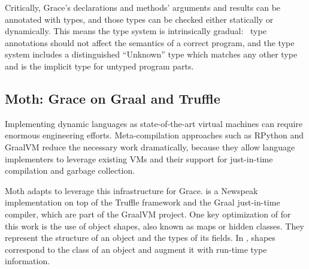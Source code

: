 Critically, Grace's declarations and methods' arguments
and results can be annotated with types, and those types can be  checked
either statically or dynamically. This means the type system is
intrinsically gradual:%
%
~type annotations should not affect the semantics of a correct
program\citep{XXXSiek2015}, and the type system
includes a distinguished ``Unknown'' type which matches any other type
and is the implicit type for untyped program parts.





\subsection{Moth: Grace on Graal and Truffle}
\label{ssec:moth}

Implementing dynamic languages as state-of-the-art virtual machines
can require enormous engineering efforts.
Meta-compilation approaches\citep{Marr:2015:MTPE}
such as RPython\citep{Bolz:2009:TMP,Bolz:2013:IMT}
and GraalVM\citep{Wurthinger2013,Wurthinger:2017:PPE}
reduce the necessary work dramatically,
because they allow language implementers to leverage existing VMs
and their support for just-in-time compilation and garbage collection.

Moth\citep{Roberts2017} adapts \SOMns\citep{SOMns} to leverage this infrastructure for Grace.
\SOMns is a Newspeak implementation\citep{Bracha:10:NS} on top of the Truffle framework and the Graal just-in-time compiler,
which are part of the GraalVM project.
One key optimization of \SOMns for this work is the use of
object shapes\citep{woss2014object},
also known as maps\citep{Self} or hidden classes.
They represent the structure of an object and the types of its fields.
In \SOMns, shapes correspond to the class of an object and augment it with
run-time type information.

